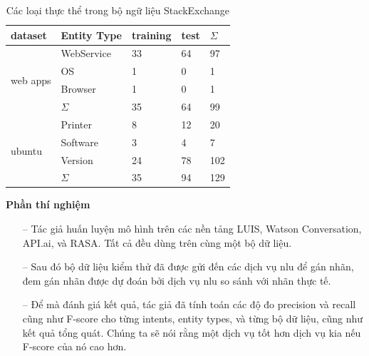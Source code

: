 \begin{table}[]
\begin{center}
\begin{tabular}{|l|l|l|l|l|}
\hline
dataset                                         & Entity Type & \textbf{training} & \textbf{test} & $\Sigma$   \\ \hline
\multicolumn{1}{|r|}{\multirow{4}{*}{web apps}} & WebService  & 33                & 64            & 97  \\ \cline{2-5} 
\multicolumn{1}{|r|}{}                          & OS          & 1                 & 0             & 1   \\ \cline{2-5} 
\multicolumn{1}{|r|}{}                          & Browser     & 1                 & 0             & 1   \\ \cline{2-5} 
\multicolumn{1}{|r|}{}                          & $\Sigma$          & 35                & 64            & 99  \\ \hline
\multirow{4}{*}{ubuntu}                         & Printer     & 8                 & 12            & 20  \\ \cline{2-5} 
                                                & Software    & 3                 & 4             & 7   \\ \cline{2-5} 
                                                & Version     & 24                & 78            & 102 \\ \cline{2-5} 
                                                & $\Sigma$           & 35                & 94            & 129 \\ \hline
\end{tabular}
\caption{Các loại thực thể trong bộ ngữ liệu StackExchange}
    \label{fig:comparisonimg-entityTypesStackExchange}
    \end{center}
\end{table}


\textbf{Phần thí nghiệm}

\begin{itemize}
    \item[--] Tác giả huấn luyện mô hình trên các nền tảng LUIS, Watson Conversation, API.ai, và RASA. Tất cả đều dùng trên cùng một bộ dữ liệu.
        \item[--]Sau đó bộ dữ liệu kiểm thử đã được gửi đến các dịch vụ \ac{nlu} để gán nhãn, đem gán nhãn được dự đoán bởi dịch vụ \ac{nlu} so sánh với nhãn thực tế.
        \item[--]Để mà đánh giá kết quả, tác giả đã tính toán các độ đo precision và recall cũng như F-score cho từng intents, entity types, và từng bộ dữ liệu, cũng như kết quả tổng quát. Chúng ta sẽ nói rằng một dịch vụ tốt hơn dịch vụ kia nếu F-score của nó cao hơn.
\end{itemize}

